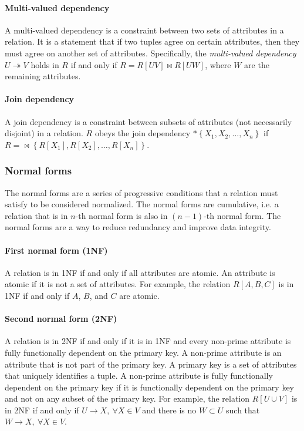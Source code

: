 \paragraph{Multi-valued dependency}  A multi-valued dependency is a constraint between
two sets of attributes in a relation.  It is a statement that if two tuples agree on
certain attributes, then they must agree on another set of attributes.  Specifically, the
\emph{multi-valued dependency} $U \twoheadrightarrow V$ holds in $R$ if and only if $R =
R[UV] \bowtie R[UW]$, where $W$ are the remaining attributes.

\paragraph{Join dependency}  A join dependency is a constraint between subsets of
attributes (not necessarily disjoint) in a relation.  $R$ obeys the join dependency $*
\left\{ X_1, X_2, \dots, X_n \right\}$ if $R = {\bowtie \left\{ R[X_1], R[X_2], \dots,
R[X_n] \right\}}$.

\subsubsection{Normal forms}

The normal forms are a series of progressive conditions that a relation must satisfy to
be considered normalized.  The normal forms are cumulative, i.e. a relation that is in
$n$-th normal form is also in $(n-1)$-th normal form.  The normal forms are a way to
reduce redundancy and improve data integrity.

\paragraph{First normal form (1NF)}  A relation is in 1NF if and only if all attributes
are atomic.  An attribute is atomic if it is not a set of attributes.  For example, the
relation $R[A, B, C]$ is in 1NF if and only if $A$, $B$, and $C$ are atomic.

\paragraph{Second normal form (2NF)}  A relation is in 2NF if and only if it is in 1NF
and every non-prime attribute is fully functionally dependent on the primary key.  A
non-prime attribute is an attribute that is not part of the primary key.  A primary key
is a set of attributes that uniquely identifies a tuple.  A non-prime attribute is fully
functionally dependent on the primary key if it is functionally dependent on the primary
key and not on any subset of the primary key.  For example, the relation $R[U \cup V]$ is
in 2NF if and only if $U \to X,~\forall X \in V$ and there is no $W \subset U$ such that
$W \to X,~\forall X \in V$.

